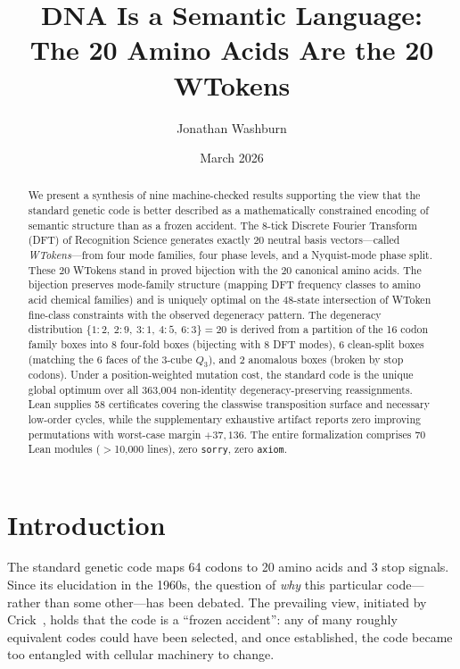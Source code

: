 \documentclass[11pt,twocolumn]{article}
\title{DNA Is a Semantic Language:\\The 20 Amino Acids Are the 20 WTokens}
\author[1]{Jonathan Washburn}
\affil[1]{Independent Researcher}
\date{March 2026}
\begin{document}
\maketitle

\begin{abstract}
We present a synthesis of nine machine-checked results supporting the view
that the standard genetic code is better described as a mathematically
constrained encoding of semantic structure than as a frozen accident. The
8-tick Discrete Fourier Transform (DFT)
of Recognition Science generates exactly 20 neutral basis vectors---called
\emph{WTokens}---from four mode families, four phase levels, and a
Nyquist-mode phase split. These 20 WTokens stand in proved bijection with
the 20 canonical amino acids. The bijection preserves mode-family structure
(mapping DFT frequency classes to amino acid chemical families) and is
uniquely optimal on the 48-state intersection of WToken fine-class
constraints with the observed degeneracy pattern. The degeneracy
distribution $\{1{:}2,\ 2{:}9,\ 3{:}1,\ 4{:}5,\ 6{:}3\} = 20$ is derived
from a partition of the 16 codon family boxes into 8 four-fold boxes
(bijecting with 8 DFT modes), 6 clean-split boxes (matching the 6 faces
of the 3-cube $Q_3$), and 2 anomalous boxes (broken by stop codons). Under
a position-weighted mutation cost, the standard code is the unique global
optimum over all 363,004 non-identity degeneracy-preserving reassignments.
Lean supplies 58 certificates covering the classwise transposition surface
and necessary low-order cycles, while the supplementary exhaustive artifact
reports zero improving permutations with worst-case margin $+37{,}136$. The
entire formalization comprises 70 Lean modules ($>$10,000 lines), zero
\texttt{sorry}, zero \texttt{axiom}.
\end{abstract}

\section{Introduction}

The standard genetic code maps 64 codons to 20 amino acids and 3 stop
signals. Since its elucidation in the 1960s, the question of \emph{why}
this particular code---rather than some other---has been debated. The
prevailing view, initiated by Crick~\cite{Crick1968}, holds that the code
is a ``frozen accident'': any of many roughly equivalent codes could have
been selected, and once established, the code became too entangled with
cellular machinery to change.
\end{document}
